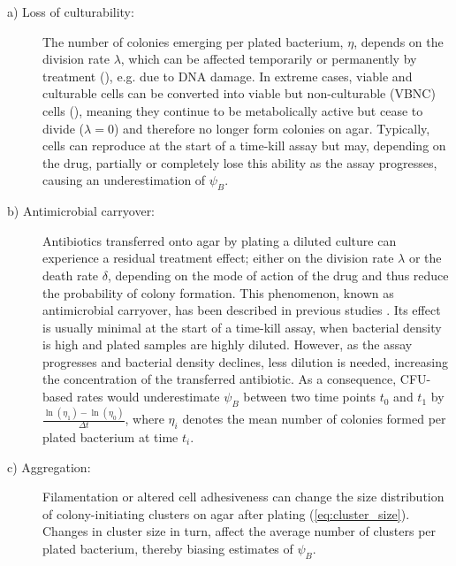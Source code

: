 \begin{description}
\item[a) Loss of culturability:]
The number of colonies emerging per plated bacterium, \(\eta\), depends on the division rate \(\lambda\), which can be affected temporarily or permanently by treatment (\cite{Eagle1949}), e.g. due to DNA damage.
In extreme cases, viable and culturable cells can be converted into viable but non-culturable (VBNC) cells (\cite{Besnard2002, Oliver2005, Li2014}), meaning they continue to be metabolically active but cease to divide ($\lambda = 0$) and therefore no longer form colonies on agar.
Typically, cells can reproduce at the start of a time-kill assay but may, depending on the drug, partially or completely lose this ability as the assay progresses, causing an underestimation of $\psi_B$.

\item[b) Antimicrobial carryover:]
Antibiotics transferred onto agar by plating a diluted culture can experience a residual treatment effect; either on the division rate $\lambda$ or the death rate $\delta$, depending on the mode of action of the drug and thus reduce the probability of colony formation.
This phenomenon, known as antimicrobial carryover, has been described in previous studies \cite{Pearson1980, Eng1991, Coates2018}.
Its effect is usually minimal at the start of a time-kill assay, when bacterial density is high and plated samples are highly diluted.
However, as the assay progresses and bacterial density declines, less dilution is needed, increasing the concentration of the transferred antibiotic.
As a consequence, CFU-based rates would underestimate \(\psi_B\) between two time points \(t_0\) and \(t_1\) by \(\frac{\ln(\eta_1) - \ln(\eta_0)}{\Delta t}\), where \(\eta_i\) denotes the mean number of colonies formed per plated bacterium at time \(t_i\).

\item[c) Aggregation:] Filamentation or altered cell adhesiveness can change the size distribution of colony-initiating clusters on agar after plating (\autoref{eq:cluster_size}).
Changes in cluster size in turn, affect the average number of clusters per plated bacterium, thereby biasing estimates of \(\psi_B\).
\end{description}

